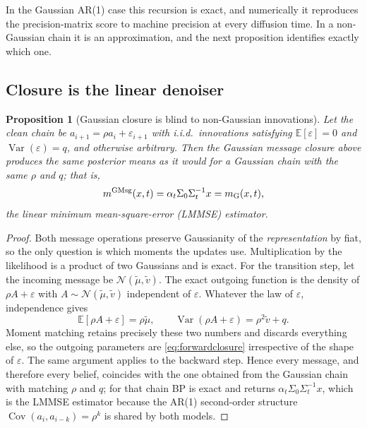 \documentclass[11pt]{article}
\newtheorem{proposition}{Proposition}
\newcommand{\E}{\mathbb{E}}
\newcommand{\Var}{\operatorname{Var}}
\newcommand{\Cov}{\operatorname{Cov}}
\newcommand{\Normal}{\mathcal{N}}
\begin{document}
In the Gaussian AR(1) case this recursion is exact, and numerically it reproduces the
precision-matrix score to machine precision at every diffusion time. In a non-Gaussian
chain it is an approximation, and the next proposition identifies exactly which one.

\subsection{Closure is the linear denoiser}

\begin{proposition}[Gaussian closure is blind to non-Gaussian innovations]
\label{prop:lmmse}
Let the clean chain be \(a_{i+1}=\rho a_i+\varepsilon_{i+1}\) with i.i.d.\ innovations
satisfying \(\E[\varepsilon]=0\) and \(\Var(\varepsilon)=q\), and otherwise arbitrary.
Then the Gaussian message closure above produces the same posterior means as it would for
a Gaussian chain with the same \(\rho\) and \(q\); that is,
\begin{equation}
  m^{\rm GMsg}(x,t)=\alpha_t\Sigma_0\Sigma_t^{-1}x=m_{\rm G}(x,t),
\end{equation}
the linear minimum mean-square-error (LMMSE) estimator.
\end{proposition}

\begin{proof}
Both message operations preserve Gaussianity of the \emph{representation} by fiat, so the
only question is which moments the updates use. Multiplication by the likelihood is a
product of two Gaussians and is exact. For the transition step, let the incoming message
be \(\Normal(\widetilde\mu,\widetilde v)\). The exact outgoing function is the density of
\(\rho A+\varepsilon\) with \(A\sim\Normal(\widetilde\mu,\widetilde v)\) independent of
\(\varepsilon\). Whatever the law of \(\varepsilon\), independence gives
\begin{equation}
  \E[\rho A+\varepsilon]=\rho\widetilde\mu,
  \qquad
  \Var(\rho A+\varepsilon)=\rho^2\widetilde v+q .
\end{equation}
Moment matching retains precisely these two numbers and discards everything else, so the
outgoing parameters are \eqref{eq:forwardclosure} irrespective of the shape of
\(\varepsilon\). The same argument applies to the backward step. Hence every message, and
therefore every belief, coincides with the one obtained from the Gaussian chain with
matching \(\rho\) and \(q\); for that chain BP is exact and returns
\(\alpha_t\Sigma_0\Sigma_t^{-1}x\), which is the LMMSE estimator because the AR(1)
second-order structure \(\Cov(a_i,a_{i-k})=\rho^k\) is shared by both models.
\end{proof}
\end{document}
